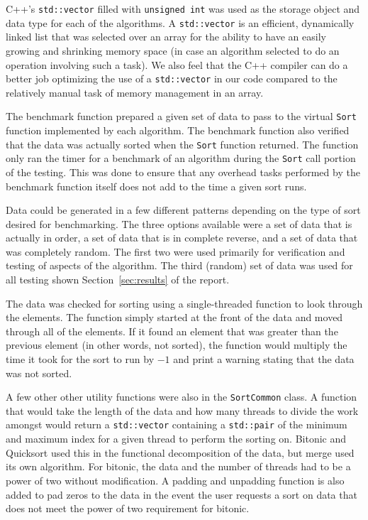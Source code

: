 \documentclass[journal]{IEEEtran}
\begin{document}
C++'s \texttt{std::vector} filled with \texttt{unsigned int} was used as the storage object and data type for each of the algorithms. A \texttt{std::vector} is an efficient, dynamically linked list that was selected over an array for the ability to have an easily growing and shrinking memory space (in case an algorithm selected to do an operation involving such a task). We also feel that the C++ compiler can do a better job optimizing the use of a \texttt{std::vector} in our code compared to the relatively manual task of memory management in an array.

The benchmark function prepared a given set of data to pass to the virtual \texttt{Sort} function implemented by each algorithm. The benchmark function also verified that the data was actually sorted when the \texttt{Sort} function returned. The function only ran the timer for a benchmark of an algorithm during the \texttt{Sort} call portion of the testing. This was done to ensure that any overhead tasks performed by the benchmark function itself does not add to the time a given sort runs.

Data could be generated in a few different patterns depending on the type of sort desired for benchmarking. The three options available were a set of data that is actually in order, a set of data that is in complete reverse, and a set of data that was completely random. The first two were used primarily for verification and testing of aspects of the algorithm. The third (random) set of data was used for all testing shown Section~\ref{sec:results} of the report.

The data was checked for sorting using a single-threaded function to look through the elements. The function simply started at the front of the data and moved through all of the elements. If it found an element that was greater than the previous element (in other words, not sorted), the function would multiply the time it took for the sort to run by $-1$ and print a warning stating that the data was not sorted.

A few other other utility functions were also in the \texttt{SortCommon} class. A function that would take the length of the data and how many threads to divide the work amongst would return a \texttt{std::vector} containing a \texttt{std::pair} of the minimum and maximum index for a given thread to perform the sorting on. Bitonic and Quicksort used this in the functional decomposition of the data, but merge used its own algorithm. For bitonic, the data and the number of threads had to be a power of two without modification. A padding and unpadding function is also added to pad zeros to the data in the event the user requests a sort on data that does not meet the power of two requirement for bitonic.
\end{document}
